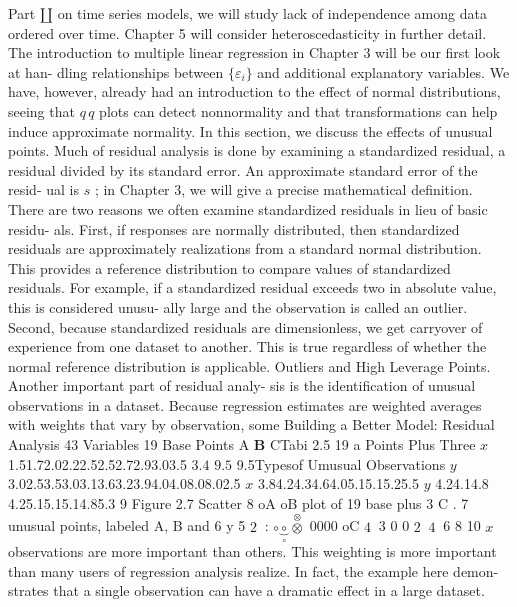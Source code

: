 \documentclass[11pt]{article}
\begin{document}
Part \(\amalg\) on time series models, we will study lack of independence among data
 ordered over time. Chapter 5 will consider heteroscedasticity in further detail. The
 introduction to multiple linear regression in Chapter 3 will be our first look at han-
 dling relationships between \(\{\varepsilon_{i} \}\) and additional explanatory variables. We have,
however, already had an introduction to the effect of normal distributions, seeing
that \(q \, q\) plots can detect nonnormality and that transformations can help induce
 approximate normality. In this section, we discuss the effects of unusual points.
 Much of residual analysis is done by examining a standardized residual, a
residual divided by its standard error. An approximate standard error of the resid-
 ual is \(s\) ; in Chapter 3, we will give a precise mathematical definition. There are
two reasons we often examine standardized residuals in lieu of basic residu-
als. First, if responses are normally distributed, then standardized residuals are
 approximately realizations from a standard normal distribution. This provides a
reference distribution to compare values of standardized residuals. For example,
if a standardized residual exceeds two in absolute value, this is considered unusu-
ally large and the observation is called an outlier. Second, because standardized
residuals are dimensionless, we get carryover of experience from one dataset to
 another. This is true regardless of whether the normal reference distribution is
 applicable.
 Outliers and High Leverage Points. Another important part of residual analy-
sis is the identification of unusual observations in a dataset. Because regression
estimates are weighted averages with weights that vary by observation, some
 Building a Better Model: Residual Analysis 43
 Variables 19 Base Points \(\mathrm{A}\) \(\mathbf{B}\) CTabi 2.5 19 a
Points Plus Three
\(x\) 1.51.72.02.22.52.52.72.93.03.5 \(3 . 4\) \(9 . 5\) 9.5Typesof Umusual
Observations
\(y\) 3.02.53.53.03.13.63.23.94.04.08.08.02.5
\(x\) 3.84.24.34.64.05.15.15.25.5
\(y\) 4.24.14.8 4.25.15.15.14.85.3
9 Figure 2.7 Scatter
8 oA oB plot of 19 base plus 3 \(\mathrm{C}\) .
7 unusual points,
labeled A, B and
6
y 5
\(2 ~\) : \(\circ\underset{\circ} {\underbrace{\circ}} \overset{\otimes} {\otimes}\) 0000 oC
\(4 ~\)
3 0
0 \(2 ~\) \(4 ~\) 6 8 10
\(x\)
observations are more important than others. This weighting is more important
 than many users of regression analysis realize. In fact, the example here demon-
strates that a single observation can have a dramatic effect in a large dataset.
\end{document}

